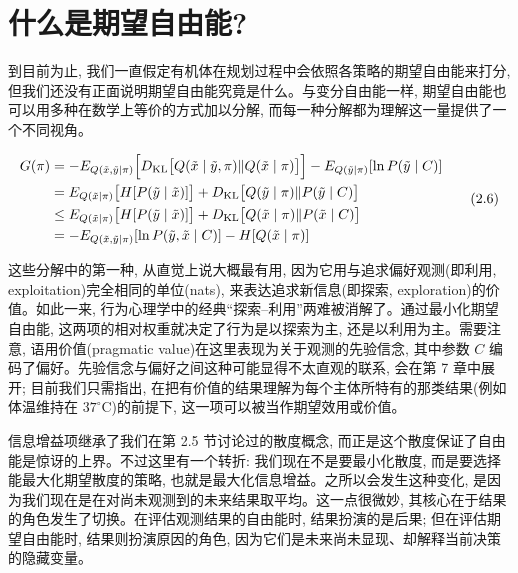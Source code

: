 \section{什么是期望自由能?}

到目前为止, 我们一直假定有机体在规划过程中会依照各策略的期望自由能来打分, 但我们还没有正面说明期望自由能究竟是什么。与变分自由能一样, 期望自由能也可以用多种在数学上等价的方式加以分解, 而每一种分解都为理解这一量提供了一个不同视角。

\begin{equation}
\begin{aligned}
G(\pi)
&= - E_{Q(\tilde{x}, \tilde{y}\mid \pi)} \Bigl[D_{\mathrm{KL}}\bigl[Q(\tilde{x}\mid \tilde{y}, \pi)\Vert Q(\tilde{x}\mid \pi)\bigr]\Bigr]
   - E_{Q(\tilde{y}\mid \pi)}[\ln P(\tilde{y}\mid C)] \\
&= E_{Q(\tilde{x}\mid \pi)}\bigl[H[P(\tilde{y}\mid \tilde{x})]\bigr]
   + D_{\mathrm{KL}}\bigl[Q(\tilde{y}\mid \pi)\Vert P(\tilde{y}\mid C)\bigr] \\
&\le E_{Q(\tilde{x}\mid \pi)}\bigl[H[P(\tilde{y}\mid \tilde{x})]\bigr]
   + D_{\mathrm{KL}}\bigl[Q(\tilde{x}\mid \pi)\Vert P(\tilde{x}\mid C)\bigr] \\
&= - E_{Q(\tilde{x}, \tilde{y}\mid \pi)}[\ln P(\tilde{y}, \tilde{x}\mid C)] - H[Q(\tilde{x}\mid \pi)]
\end{aligned}
\tag{2.6}
\end{equation}

这些分解中的第一种, 从直觉上说大概最有用, 因为它用与追求偏好观测(即利用, exploitation)完全相同的单位(nats), 来表达追求新信息(即探索, exploration)的价值。如此一来, 行为心理学中的经典``探索--利用''两难被消解了。通过最小化期望自由能, 这两项的相对权重就决定了行为是以探索为主, 还是以利用为主。需要注意, 语用价值(pragmatic value)在这里表现为关于观测的先验信念, 其中参数 $C$ 编码了偏好。先验信念与偏好之间这种可能显得不太直观的联系, 会在第 7 章中展开; 目前我们只需指出, 在把有价值的结果理解为每个主体所特有的那类结果(例如体温维持在 $37^\circ\mathrm{C}$)的前提下, 这一项可以被当作期望效用或价值。

信息增益项继承了我们在第 2.5 节讨论过的散度概念, 而正是这个散度保证了自由能是惊讶的上界。不过这里有一个转折: 我们现在不是要最小化散度, 而是要选择能最大化期望散度的策略, 也就是最大化信息增益。之所以会发生这种变化, 是因为我们现在是在对尚未观测到的未来结果取平均。这一点很微妙, 其核心在于结果的角色发生了切换。在评估观测结果的自由能时, 结果扮演的是后果; 但在评估期望自由能时, 结果则扮演原因的角色, 因为它们是未来尚未显现、却解释当前决策的隐藏变量。

